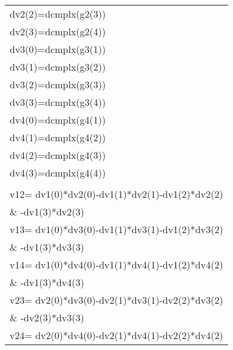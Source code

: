 \begin{center}
{\begin{supertabular}{l}
      \hspace{0.5em} dv2(2)=dcmplx(g2(3))\\
      \hspace{0.5em} dv2(3)=dcmplx(g2(4))\\
      \hspace{0.5em} dv3(0)=dcmplx(g3(1))\\
      \hspace{0.5em} dv3(1)=dcmplx(g3(2))\\
      \hspace{0.5em} dv3(2)=dcmplx(g3(3))\\
      \hspace{0.5em} dv3(3)=dcmplx(g3(4))\\
      \hspace{0.5em} dv4(0)=dcmplx(g4(1))\\
      \hspace{0.5em} dv4(1)=dcmplx(g4(2))\\
      \hspace{0.5em} dv4(2)=dcmplx(g4(3))\\
      \hspace{0.5em} dv4(3)=dcmplx(g4(4))\\
\\
      \hspace{0.5em} v12= dv1(0)*dv2(0)-dv1(1)*dv2(1)-dv1(2)*dv2(2)\\
      \hspace{0.5em}\& \hspace{1.5em}-dv1(3)*dv2(3)\\
      \hspace{0.5em} v13= dv1(0)*dv3(0)-dv1(1)*dv3(1)-dv1(2)*dv3(2)\\
       \hspace{0.5em}\& \hspace{1.5em}-dv1(3)*dv3(3)\\
      \hspace{0.5em} v14= dv1(0)*dv4(0)-dv1(1)*dv4(1)-dv1(2)*dv4(2)\\
       \hspace{0.5em}\& \hspace{1.5em}-dv1(3)*dv4(3)\\
      \hspace{0.5em} v23= dv2(0)*dv3(0)-dv2(1)*dv3(1)-dv2(2)*dv3(2)\\
       \hspace{0.5em}\& \hspace{1.5em}-dv2(3)*dv3(3)\\
      \hspace{0.5em} v24= dv2(0)*dv4(0)-dv2(1)*dv4(1)-dv2(2)*dv4(2)\\

\end{supertabular}}
\end{center}
